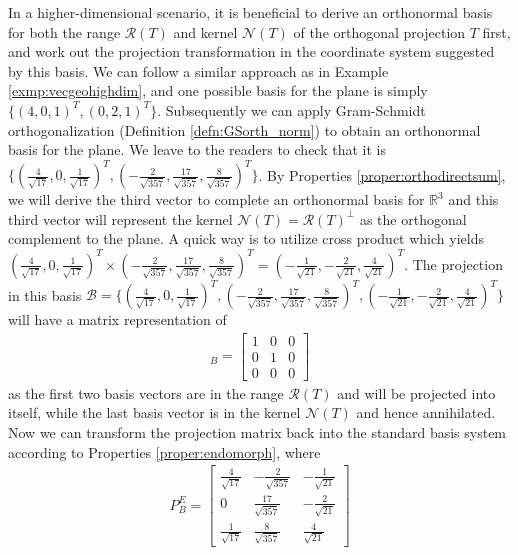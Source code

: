 \begin{solution}
In a higher-dimensional scenario, it is beneficial to derive an orthonormal basis for both the range $\mathcal{R}(T)$ and kernel $\mathcal{N}(T)$ of the orthogonal projection $T$ first, and work out the projection transformation in the coordinate system suggested by this basis. We can follow a similar approach as in Example \ref{exmp:vecgeohighdim}, and one possible basis for the plane is simply $\{(4,0,1)^T, (0,2,1)^T\}$. Subsequently we can apply Gram-Schmidt orthogonalization (Definition \ref{defn:GSorth_norm}) to obtain an orthonormal basis for the plane. We leave to the readers to check that it is $\{(\frac{4}{\sqrt{17}}, 0, \frac{1}{\sqrt{17}})^T, (-\frac{2}{\sqrt{357}}, \frac{17}{\sqrt{357}}, \frac{8}{\sqrt{357}})^T\}$. By Properties \ref{proper:orthodirectsum}, we will derive the third vector to complete an orthonormal basis for $\mathbb{R}^3$ and this third vector will represent the kernel $\mathcal{N}(T) = \mathcal{R}(T)^\perp$ as the orthogonal complement to the plane. A quick way is to utilize cross product which yields $(\frac{4}{\sqrt{17}}, 0, \frac{1}{\sqrt{17}})^T \times (-\frac{2}{\sqrt{357}}, \frac{17}{\sqrt{357}}, \frac{8}{\sqrt{357}})^T = (-\frac{1}{\sqrt{21}}, -\frac{2}{\sqrt{21}}, \frac{4}{\sqrt{21}})^T$. The projection in this basis $\mathcal{B} = \{(\frac{4}{\sqrt{17}}, 0, \frac{1}{\sqrt{17}})^T, (-\frac{2}{\sqrt{357}}, \frac{17}{\sqrt{357}}, \frac{8}{\sqrt{357}})^T, (-\frac{1}{\sqrt{21}}, -\frac{2}{\sqrt{21}}, \frac{4}{\sqrt{21}})^T\}$ will have a matrix representation of
\begin{align*}
[T]_B = 
\begin{bmatrix}
1 & 0 & 0 \\
0 & 1 & 0 \\
0 & 0 & 0
\end{bmatrix}
\end{align*}
as the first two basis vectors are in the range $\mathcal{R}(T)$ and will be projected into itself, while the last basis vector is in the kernel $\mathcal{N}(T)$ and hence annihilated. Now we can transform the projection matrix back into the standard basis system according to Properties \ref{proper:endomorph}, where
\begin{align*}
P_B^E = 
\begin{bmatrix}
\frac{4}{\sqrt{17}} & -\frac{2}{\sqrt{357}} & -\frac{1}{\sqrt{21}} \\
0 & \frac{17}{\sqrt{357}} & -\frac{2}{\sqrt{21}} \\
\frac{1}{\sqrt{17}} & \frac{8}{\sqrt{357}} & \frac{4}{\sqrt{21}}

\end{bmatrix}
\end{align*}
\end{solution}

